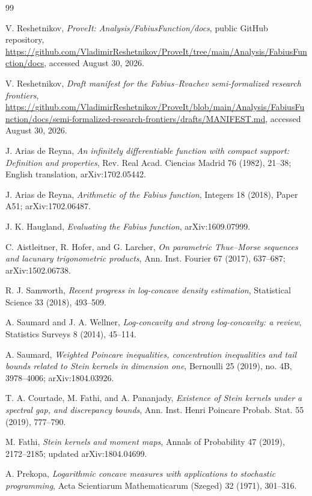 \documentclass[11pt,oneside]{article}
\theoremstyle{definition}
\theoremstyle{remark}
\begin{document}
\begin{thebibliography}{99}

V. Reshetnikov,
\emph{ProveIt: Analysis/FabiusFunction/docs}, public GitHub repository,
\url{https://github.com/VladimirReshetnikov/ProveIt/tree/main/Analysis/FabiusFunction/docs},
accessed August 30, 2026.

V. Reshetnikov,
\emph{Draft manifest for the Fabius--Rvachev semi-formalized research frontiers},
\url{https://github.com/VladimirReshetnikov/ProveIt/blob/main/Analysis/FabiusFunction/docs/semi-formalized-research-frontiers/drafts/MANIFEST.md},
accessed August 30, 2026.

J. Arias de Reyna,
\emph{An infinitely differentiable function with compact support: Definition and properties},
Rev. Real Acad. Ciencias Madrid 76 (1982), 21--38; English translation,
arXiv:1702.05442.

J. Arias de Reyna,
\emph{Arithmetic of the Fabius function},
Integers 18 (2018), Paper A51; arXiv:1702.06487.

J. K. Haugland,
\emph{Evaluating the Fabius function},
arXiv:1609.07999.

C. Aistleitner, R. Hofer, and G. Larcher,
\emph{On parametric Thue--Morse sequences and lacunary trigonometric products},
Ann. Inst. Fourier 67 (2017), 637--687; arXiv:1502.06738.

R. J. Samworth,
\emph{Recent progress in log-concave density estimation},
Statistical Science 33 (2018), 493--509.

A. Saumard and J. A. Wellner,
\emph{Log-concavity and strong log-concavity: a review},
Statistics Surveys 8 (2014), 45--114.

A. Saumard,
\emph{Weighted Poincare inequalities, concentration inequalities and tail bounds
related to Stein kernels in dimension one},
Bernoulli 25 (2019), no. 4B, 3978--4006; arXiv:1804.03926.

T. A. Courtade, M. Fathi, and A. Pananjady,
\emph{Existence of Stein kernels under a spectral gap, and discrepancy bounds},
Ann. Inst. Henri Poincare Probab. Stat. 55 (2019), 777--790.

M. Fathi,
\emph{Stein kernels and moment maps},
Annals of Probability 47 (2019), 2172--2185; updated arXiv:1804.04699.

A. Prekopa,
\emph{Logarithmic concave measures with applications to stochastic programming},
Acta Scientiarum Mathematicarum (Szeged) 32 (1971), 301--316.

\end{thebibliography}
\end{document}
